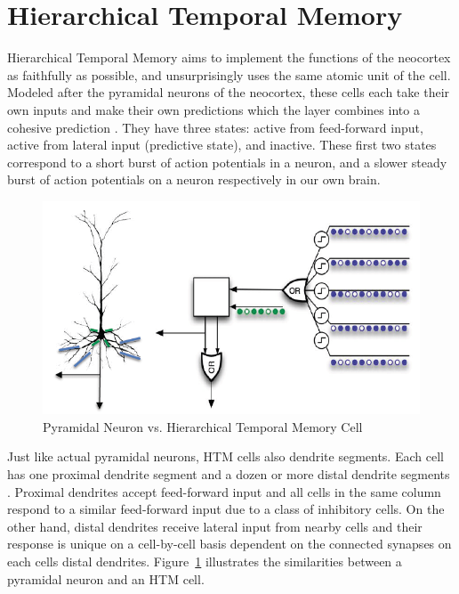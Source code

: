 \documentclass[oneside,12pt,openany]{book}
\begin{document}
	\section{Hierarchical Temporal Memory}
	
	Hierarchical Temporal Memory aims to implement the functions of the neocortex as faithfully as possible, and unsurprisingly uses the same atomic unit of the cell. Modeled after the pyramidal neurons of the neocortex, these cells each take their own inputs and make their own predictions which the layer combines into a cohesive prediction \cite{Whitepaper}. They have three states: active from feed-forward input, active from lateral input (predictive state), and inactive. These first two states correspond to a short burst of action potentials in a neuron, and a slower steady burst of action potentials on a neuron respectively in our own brain.
	
	\begin{figure}[h!]
		\centering
		\includegraphics[width=\linewidth]{images/HTMCell.jpg}
		\caption{Pyramidal Neuron vs. Hierarchical Temporal Memory Cell}
		\label{fig:HTMCell}
	\end{figure}

	Just like actual pyramidal neurons, HTM cells also dendrite segments. Each cell has one proximal dendrite segment and a dozen or more distal dendrite segments \cite {Whitepaper}. Proximal dendrites accept feed-forward input and all cells in the same column respond to a similar feed-forward input due to a class of inhibitory cells. On the other hand, distal dendrites receive lateral input from nearby cells and their response is unique on a cell-by-cell basis dependent on the connected synapses on each cells distal dendrites. Figure~\ref{fig:HTMCell} illustrates the similarities between a pyramidal neuron and an HTM cell.
	
\end{document}
